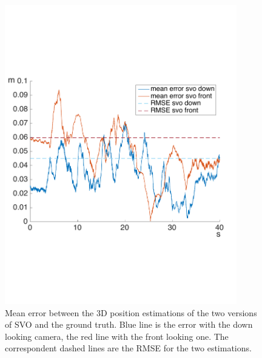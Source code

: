 \begin{figure}[!ht]
    \centering
    \includegraphics[width=0.9\textwidth]{img/comparision_between_two_svo_and_opti_error.pdf}
    \caption{Mean error between the 3D position estimations of the two versions of SVO and the ground truth. Blue line is the error with the down looking camera, the red line with the front looking one. The correspondent dashed lines are the RMSE for the two estimations.}
    \label{fig:comparision_svo_error}
\end{figure}


